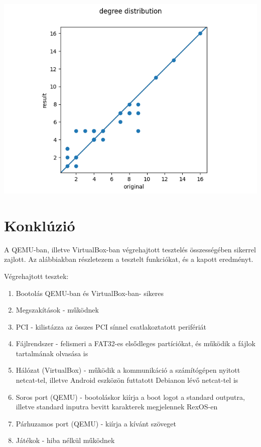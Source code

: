 \documentclass[12pt,numbers=noenddot]{report}
\begin{document}
\hspace{0.5cm}

\includegraphics[width=0.8\linewidth]{images/find_similar_scatterplot2.png}





\chapter{Konklúzió}

A QEMU-ban, illetve VirtualBox-ban végrehajtott tesztelés összességében sikerrel
zajlott. Az alábbiakban részletezem a tesztelt funkciókat, és a kapott
eredményt.

\hfill \break
Végrehajtott tesztek:

\begin{enumerate}
	\item Bootolás QEMU-ban és VirtualBox-ban- sikeres
	\item Megszakítások - működnek
	\item PCI - kilistázza az összes PCI sínnel csatlakoztatott perifériát
	\item Fájlrendszer - felismeri a FAT32-es elsődleges partíciókat, és
	működik a fájlok tartalmának olvasása is
	\item Hálózat (VirtualBox) - működik a kommunikáció a számítógépen nyitott
	netcat-tel, illetve Android eszközön futtatott Debianon lévő netcat-tel is
	\item Soros port (QEMU) - bootoláskor kiírja a boot logot a standard
	outputra, illetve standard inputra bevitt karakterek megjelennek RexOS-en
	\item Párhuzamos port (QEMU) - kiírja a kívánt szöveget
	\item Játékok - hiba nélkül működnek
\end{enumerate}
\end{document}
